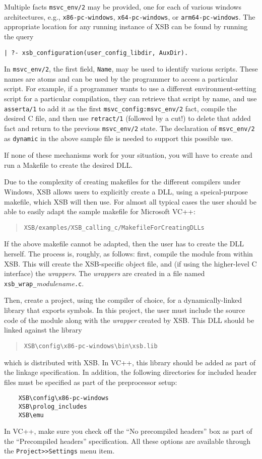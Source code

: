 Multiple facts {\tt msvc\_env/2} may be provided, one for each
of various windows architectures, e.g., \texttt{x86-pc-windows},
\texttt{x64-pc-windows}, or \texttt{arm64-pc-windows}.
The appropriate location for any running instance of XSB can be found by
running the query
\begin{verbatim}
| ?- xsb_configuration(user_config_libdir, AuxDir).
\end{verbatim}
In \texttt{msvc\_env/2}, the  first field, {\tt Name},
may be used to identify various scripts.  These
names are atoms and can be used by the programmer to access a
particular script.  For example, if a programmer wants to use a
different environment-setting script for a particular compilation,
they can retrieve that script by name, and use {\tt asserta/1} to add
it as the first {\tt msvc\_config:msvc\_env/2} fact, compile the
desired C file, and then use {\tt retract/1} (followed by a cut!) to
delete that added fact and return to the previous {\tt msvc\_env/2}
state.  The declaration of {\tt msvc\_env/2} as {\tt dynamic} in the
above sample file is needed to support this possible use.

If none of these mechanisms work for your situation, you will have to
create and run a Makefile to create the desired DLL. 

Due to the complexity of creating makefiles for the different compilers
under Windows, XSB allows users to explicitly create a DLL, using a
speical-purpose makefile, which XSB will then use.  For almost all typical
cases the user should be able to easily adapt the sample makefile for
Microsoft VC++:
\begin{quote}
 {\tt XSB/examples/XSB\_calling\_c/MakefileForCreatingDLLs}
\end{quote}

If the above makefile cannot be adapted, then the user has to create
the DLL herself.  The process is, roughly, as follows: first, compile
the module from within XSB.  This will create the XSB-specific object
file, and (if using the higher-level C interface) the
\emph{wrappers}. The \emph{wrappers} are created in a file named
\texttt{xsb\_wrap\_}\emph{modulename}\texttt{.c}.

Then, create a project, using the compiler of choice, for a
dynamically-linked library that exports symbols. In this project, the
user must include the source code of the module along with the
\emph{wrapper} created by XSB. This DLL should be linked against the
library
\begin{quote}
   \verb|XSB\config\x86-pc-windows\bin\xsb.lib|
\end{quote}
which is distributed with XSB. In VC++, this library should be added 
as part of the linkage specification. In addition, the following
directories for included header files must be specified as part of the
preprocessor setup:
\begin{verbatim}
    XSB\config\x86-pc-windows
    XSB\prolog_includes
    XSB\emu
\end{verbatim}
In VC++, make sure you check off the ``No precompiled headers'' box as part
of the ``Precompiled headers'' specification. All these options are
available through the {\tt Project>>Settings} menu item.

